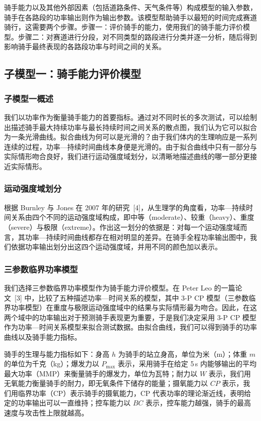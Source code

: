 \documentclass[11pt,a4paper]{ctexart}
\begin{document}
骑手能力以及其他外部因素（包括道路条件、天气条件等）构成模型的输入参数，骑手在各路段的功率输出则作为输出参数。该模型帮助骑手以最短的时间完成赛道骑行，这需要两个步骤。步骤一：评价骑手的能力，使用我们的骑手能力评价模型。步骤二：对赛道进行分段，对不同类型的路段进行分类并逐一分析，随后得到影响骑手最终表现的各路段功率与时间之间的关系。

\subsection{子模型一：骑手能力评价模型}

\subsubsection{子模型一概述}

我们以功率作为衡量骑手能力的首要指标。通过对不同时长的多次测试，可以绘制出描述骑手最大持续功率与最长持续时间之间关系的散点图，我们认为它可以拟合为一条光滑曲线。拟合曲线为何可以是光滑的？由于我们体内的生理响应是一系列连续的过程，功率—持续时间曲线本身便是光滑的。由于拟合曲线中只有一部分与实际情形吻合良好，我们进行运动强度域划分，以清晰地描述曲线的哪一部分更接近实际情形。

\subsubsection{运动强度域划分}

根据 Burnley 与 Jones 在 2007 年的研究\ [4]，从生理学的角度看，功率—持续时间关系由四个不同的运动强度域构成，即中等（moderate）、较重（heavy）、重度（severe）与极限（extreme）。作出这一划分的依据是：对每一个运动强度域而言，其功率—持续时间曲线都存在相对明显的差异。在骑手全程功率输出图中，我们依据功率输出划分出这四个运动强度域，并用不同的颜色加以表示。

\subsubsection{三参数临界功率模型}

我们选择三参数临界功率模型作为骑手能力评价模型。在 Peter Leo 的一篇论文\ [3] 中，比较了五种描述功率—时间关系的模型，其中 3-P CP 模型（三参数临界功率模型）在重度与极限运动强度域中的结果与实际情形最为吻合。因此，在这两个域中的功率输出对于预测骑手表现更为重要，于是我们决定采用 3-P CP 模型作为功率—时间关系模型来拟合测试数据。由拟合曲线，我们可以得到骑手的功率曲线以及骑手能力指标。

骑手的生理与能力指标如下：身高 $h$ 为骑手的站立身高，单位为米（m）；体重 $m$ 的单位为千克（kg）；爆发力以 $P_{\max}$ 表示，采用骑手在给定 5\,s 内能够输出的平均最大功率（MMP）来衡量骑手的爆发力，单位为瓦特；耐力以 $W$ 表示，我们用无氧能力衡量骑手的耐力，即无氧条件下储存的能量；摄氧能力以 $CP$ 表示，我们用临界功率（CP）表示骑手的摄氧能力，CP 代表功率的理论渐近线，表明给定的功率输出可以一直维持；控车能力以 $BC$ 表示，控车能力越强，骑手的最高速度与攻击性上限就越高。
\end{document}

